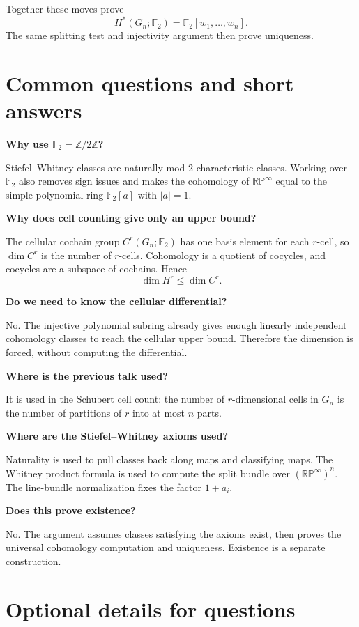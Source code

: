 \documentclass[11pt]{article}
\theoremstyle{remark}
\newcommand{\F}{\mathbb F}
\newcommand{\RP}{\mathbb{RP}}
\newcommand{\Gn}{G_n}
\begin{document}
Together these moves prove
\[
  H^*(\Gn;\F_2)=\F_2[w_1,\dots,w_n].
\]
The same splitting test and injectivity argument then prove uniqueness.

\section{Common questions and short answers}

\textbf{Why use $\F_2=\mathbb Z/2\mathbb Z$?}

Stiefel--Whitney classes are naturally mod $2$ characteristic classes.  Working over $\F_2$ also removes sign issues and makes the cohomology of $\RP^\infty$ equal to the simple polynomial ring $\F_2[a]$ with $|a|=1$.

\textbf{Why does cell counting give only an upper bound?}

The cellular cochain group $C^r(\Gn;\F_2)$ has one basis element for each $r$-cell, so $\dim C^r$ is the number of $r$-cells.  Cohomology is a quotient of cocycles, and cocycles are a subspace of cochains.  Hence
\[
  \dim H^r\le \dim C^r.
\]

\textbf{Do we need to know the cellular differential?}

No.  The injective polynomial subring already gives enough linearly independent cohomology classes to reach the cellular upper bound.  Therefore the dimension is forced, without computing the differential.

\textbf{Where is the previous talk used?}

It is used in the Schubert cell count: the number of $r$-dimensional cells in $\Gn$ is the number of partitions of $r$ into at most $n$ parts.

\textbf{Where are the Stiefel--Whitney axioms used?}

Naturality is used to pull classes back along maps and classifying maps.  The Whitney product formula is used to compute the split bundle over $(\RP^\infty)^n$.  The line-bundle normalization fixes the factor $1+a_i$.

\textbf{Does this prove existence?}

No.  The argument assumes classes satisfying the axioms exist, then proves the universal cohomology computation and uniqueness.  Existence is a separate construction.

\section{Optional details for questions}
\end{document}
